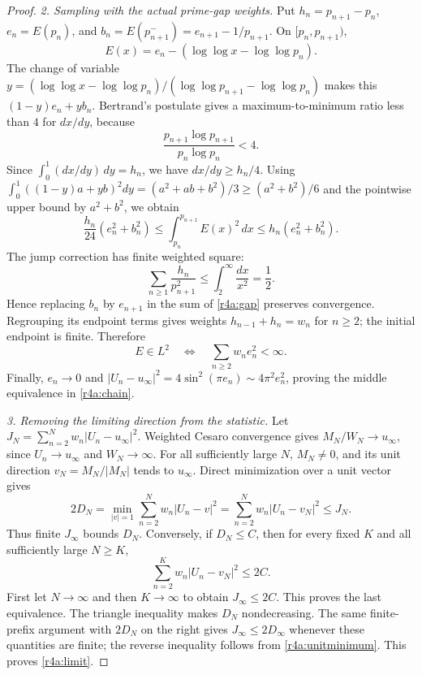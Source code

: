 \documentclass[11pt,a4paper]{article}
\theoremstyle{definition}\newtheorem{definition}[theorem]{Definition}
\theoremstyle{remark}\newtheorem{remark}[theorem]{Remark}
\numberwithin{equation}{section}
\begin{document}
\begin{proof}
\medskip
\textit{2. Sampling with the actual prime-gap weights.}
Put $h_n=p_{n+1}-p_n$, $e_n=E(p_n)$, and
$b_n=E(p_{n+1}^{-})=e_{n+1}-1/p_{n+1}$.
On $[p_n,p_{n+1})$,
\[
 E(x)=e_n-(\log\log x-\log\log p_n).
\]
The change of variable
$y=(\log\log x-\log\log p_n)/
       (\log\log p_{n+1}-\log\log p_n)$
makes this $(1-y)e_n+yb_n$.  Bertrand's postulate gives a
maximum-to-minimum ratio less than $4$ for $dx/dy$, because
\[
 \frac{p_{n+1}\log p_{n+1}}{p_n\log p_n}<4.
\]
Since $\int_0^1(dx/dy)\,dy=h_n$, we have $dx/dy\geq h_n/4$.
Using
$\int_0^1((1-y)a+yb)^2dy=(a^2+ab+b^2)/3
 \geq(a^2+b^2)/6$
and the pointwise upper bound by $a^2+b^2$, we obtain
\begin{equation}\label{r4a:gap}
 \frac{h_n}{24}(e_n^2+b_n^2)
  \leq\int_{p_n}^{p_{n+1}}E(x)^2\,dx
  \leq h_n(e_n^2+b_n^2).
\end{equation}
The jump correction has finite weighted square:
\[
 \sum_{n\geq1}\frac{h_n}{p_{n+1}^2}
 \leq\int_2^\infty\frac{dx}{x^2}=\frac12.
\]
Hence replacing $b_n$ by $e_{n+1}$ in the sum of
\eqref{r4a:gap} preserves convergence.  Regrouping its endpoint
terms gives weights $h_{n-1}+h_n=w_n$ for $n\geq2$; the initial
endpoint is finite.  Therefore
\[
 E\in L^2\quad\Longleftrightarrow\quad
 \sum_{n\geq2}w_ne_n^2<\infty.
\]
Finally, $e_n\to0$ and
$|U_n-u_\infty|^2=4\sin^2(\pi e_n)\sim4\pi^2e_n^2$,
proving the middle equivalence in \eqref{r4a:chain}.

\medskip
\textit{3. Removing the limiting direction from the statistic.}
Let $J_N=\sum_{n=2}^Nw_n|U_n-u_\infty|^2$.
Weighted Cesaro convergence gives $M_N/W_N\to u_\infty$, since
$U_n\to u_\infty$ and $W_N\to\infty$.
For all sufficiently large $N$, $M_N\ne0$, and its unit direction
$v_N=M_N/|M_N|$ tends to $u_\infty$.  Direct minimization over a
unit vector gives
\begin{equation}\label{r4a:unitminimum}
 2D_N=\min_{|v|=1}\sum_{n=2}^Nw_n|U_n-v|^2
     =\sum_{n=2}^Nw_n|U_n-v_N|^2
     \leq J_N.
\end{equation}
Thus finite $J_\infty$ bounds $D_N$.  Conversely, if $D_N\leq C$,
then for every fixed $K$ and all sufficiently large $N\geq K$,
\[
 \sum_{n=2}^K w_n|U_n-v_N|^2\leq2C.
\]
First let $N\to\infty$ and then $K\to\infty$ to obtain
$J_\infty\leq2C$.  This proves the last equivalence.
The triangle inequality makes $D_N$ nondecreasing.  The same
finite-prefix argument with $2D_N$ on the right gives
$J_\infty\leq2D_\infty$ whenever these quantities are finite;
the reverse inequality follows from \eqref{r4a:unitminimum}.
This proves \eqref{r4a:limit}.
\end{proof}
\end{document}
